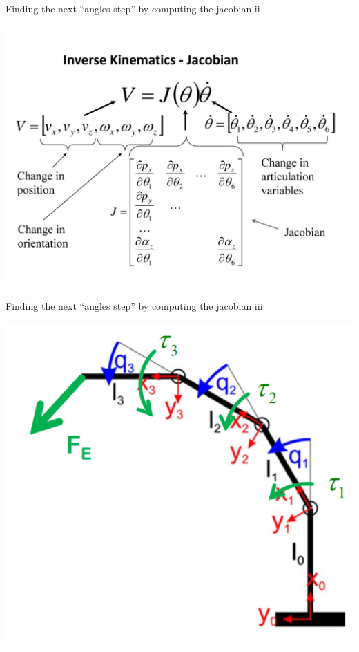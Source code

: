\documentclass{beamer}
\begin{document}
\begin{frame}{Finding the next ``angles step'' by computing the jacobian ii}

	\includegraphics[scale = 1.2]{slide_31.jpg}\cite{5}
\end{frame}

\begin{frame}{Finding the next ``angles step'' by computing the jacobian iii}

	\includegraphics[scale = 0.7]{eth1.PNG}\cite{6}
\end{frame}
\end{document}
